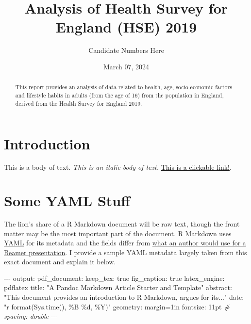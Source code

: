 \documentclass[
  11pt,
]{article}
\title{Analysis of Health Survey for England (HSE) 2019}
\author{Candidate Numbers Here}
\date{March 07, 2024}
\newenvironment{Shaded}{\begin{snugshade}}{\end{snugshade}}
\newcommand{\CommentTok}[1]{\textcolor[rgb]{0.56,0.35,0.01}{\textit{#1}}}
\newcommand{\NormalTok}[1]{#1}
\newcommand{\OtherTok}[1]{\textcolor[rgb]{0.56,0.35,0.01}{#1}}
\newcommand{\SpecialCharTok}[1]{\textcolor[rgb]{0.00,0.00,0.00}{#1}}
\newcommand{\StringTok}[1]{\textcolor[rgb]{0.31,0.60,0.02}{#1}}
\begin{document}
\maketitle
\begin{abstract}
This report provides an analysis of data related to health, age,
socio-economic factors and lifestyle habits in adults (from the age of
16) from the population in England, derived from the Health Survey for
England 2019.
\end{abstract}

\newpage

\hypertarget{introduction}{%
\section{Introduction}\label{introduction}}

This is a body of text. \emph{This is an italic body of text.}
\href{https://google.com}{This is a clickable link!}.

\hypertarget{some-yaml-stuff}{%
\section{Some YAML Stuff}\label{some-yaml-stuff}}

The lion's share of a R Markdown document will be raw text, though the
front matter may be the most important part of the document. R Markdown
uses \href{http://www.yaml.org/}{YAML} for its metadata and the fields
differ from
\href{http://svmiller.com/blog/2015/02/moving-from-beamer-to-r-markdown/}{what
an author would use for a Beamer presentation}. I provide a sample YAML
metadata largely taken from this exact document and explain it below.

\begin{Shaded}
\begin{Highlighting}[]
\SpecialCharTok{{-}{-}{-}}
\NormalTok{output}\SpecialCharTok{:} 
\NormalTok{  pdf\_document}\SpecialCharTok{:}
\NormalTok{    keep\_tex}\SpecialCharTok{:}\NormalTok{ true}
\NormalTok{    fig\_caption}\SpecialCharTok{:}\NormalTok{ true}
\NormalTok{    latex\_engine}\SpecialCharTok{:}\NormalTok{ pdflatex}
\NormalTok{title}\SpecialCharTok{:} \StringTok{"A Pandoc Markdown Article Starter and Template"}
\NormalTok{abstract}\SpecialCharTok{:} \StringTok{"This document provides an introduction to R Markdown, argues for its..."}
\NormalTok{date}\SpecialCharTok{:} \StringTok{"\textasciigrave{}r format(Sys.time(), \textquotesingle{}\%B \%d, \%Y\textquotesingle{})\textasciigrave{}"}
\NormalTok{geometry}\SpecialCharTok{:}\NormalTok{ margin}\OtherTok{=}\NormalTok{1in}
\NormalTok{fontsize}\SpecialCharTok{:}\NormalTok{ 11pt}
\CommentTok{\# spacing: double}
\SpecialCharTok{{-}{-}{-}}
\end{Highlighting}
\end{Shaded}
\end{document}
